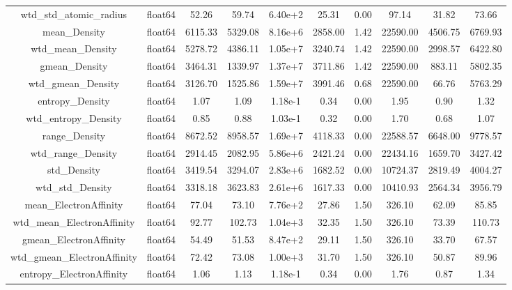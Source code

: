 \documentclass[11pt]{article}
\begin{document}
\begin{table}
{\begin{tabular}{|c|c|c|c|c|c|c|c|c|c|}
wtd\_std\_atomic\_radius            & float64&    52.26&    59.74&  6.40e+2&    25.31&    0.00&     97.14&    31.82&    73.66 \\
mean\_Density                     & float64&  6115.33&  5329.08&  8.16e+6&  2858.00&    1.42&  22590.00&  4506.75&  6769.93 \\
wtd\_mean\_Density                 & float64&  5278.72&  4386.11&  1.05e+7&  3240.74&    1.42&  22590.00&  2998.57&  6422.80 \\
gmean\_Density                    & float64&  3464.31&  1339.97&  1.37e+7&  3711.86&    1.42&  22590.00&   883.11&  5802.35 \\
wtd\_gmean\_Density                & float64&  3126.70&  1525.86&  1.59e+7&  3991.46&    0.68&  22590.00&    66.76&  5763.29 \\
entropy\_Density                  & float64&     1.07&     1.09&  1.18e-1&     0.34&    0.00&      1.95&     0.90&     1.32 \\
wtd\_entropy\_Density              & float64&     0.85&     0.88&  1.03e-1&     0.32&    0.00&      1.70&     0.68&     1.07 \\
range\_Density                    & float64&  8672.52&  8958.57&  1.69e+7&  4118.33&    0.00&  22588.57&  6648.00&  9778.57 \\
wtd\_range\_Density                & float64&  2914.45&  2082.95&  5.86e+6&  2421.24&    0.00&  22434.16&  1659.70&  3427.42 \\
std\_Density                      & float64&  3419.54&  3294.07&  2.83e+6&  1682.52&    0.00&  10724.37&  2819.49&  4004.27 \\
wtd\_std\_Density                  & float64&  3318.18&  3623.83&  2.61e+6&  1617.33&    0.00&  10410.93&  2564.34&  3956.79 \\
mean\_ElectronAffinity            & float64&    77.04&    73.10&  7.76e+2&    27.86&    1.50&    326.10&    62.09&    85.85 \\
wtd\_mean\_ElectronAffinity        & float64&    92.77&   102.73&  1.04e+3&    32.35&    1.50&    326.10&    73.39&   110.73 \\
gmean\_ElectronAffinity           & float64&    54.49&    51.53&  8.47e+2&    29.11&    1.50&    326.10&    33.70&    67.57 \\
wtd\_gmean\_ElectronAffinity       & float64&    72.42&    73.08&  1.00e+3&    31.70&    1.50&    326.10&    50.87&    89.96 \\
entropy\_ElectronAffinity         & float64&     1.06&     1.13&  1.18e-1&     0.34&    0.00&      1.76&     0.87&     1.34 \\

\end{tabular}}
\end{table}
\end{document}
